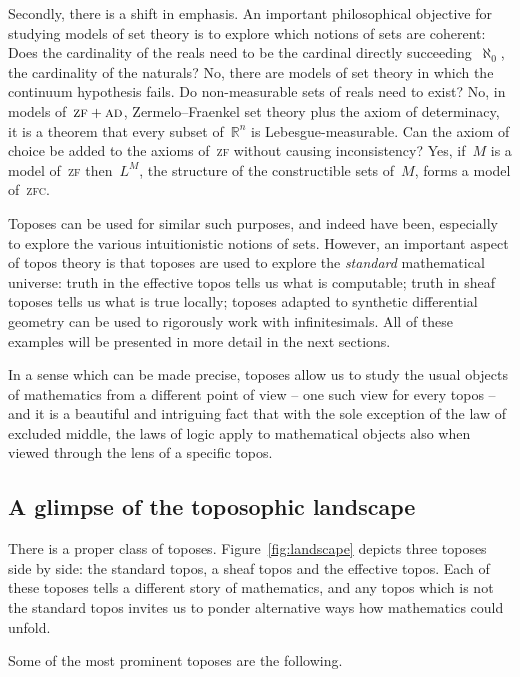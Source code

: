 \documentclass[oneside,reqno]{amsart}
\theoremstyle{definition}
\theoremstyle{plain}
\theoremstyle{remark}
\newcommand{\RR}{\mathbb{R}}
\renewcommand{\_}{\mathpunct{.}\,}
\newcommand{\effective}{ef{}fective\xspace}
\newcommand{\?}{\,{:}\,}
\begin{document}
Secondly, there is a shift in emphasis. An important philosophical objective
for studying models of set theory is to explore which notions of sets are
coherent: Does the cardinality of the reals need to be the cardinal directly
succeeding~$\aleph_0$, the cardinality of the naturals? No, there are models of
set theory in which the continuum hypothesis fails. Do non-measurable sets of
reals need to exist? No, in models of~$\textsc{zf}+\textsc{ad}$,
Zermelo--Fraenkel set theory plus the axiom of determinacy, it is a theorem that
every subset of~$\RR^n$ is Lebesgue-measurable. Can the axiom of choice be
added to the axioms of~\textsc{zf} without causing inconsistency? Yes, if~$M$
is a model of~\textsc{zf} then~$L^M$, the structure of the constructible sets of~$M$, forms a
model of~\textsc{zfc}.

Toposes can be used for similar such purposes, and indeed have been,
especially to explore the various intuitionistic notions of sets. However, an important
aspect of topos theory is that toposes are used to explore the \emph{standard}
mathematical universe: truth in the \effective topos tells us what is
computable; truth in sheaf toposes tells us what is true locally; toposes
adapted to synthetic differential geometry can be used to rigorously work with
infinitesimals. All of these examples will be presented in more detail in the
next sections.

In a sense which can be made precise, toposes allow us to study the usual
objects of mathematics from a different point of view -- one such view for
every topos -- and it is a beautiful and intriguing fact that with the sole
exception of the law of excluded middle, the laws of logic apply to
mathematical objects also when viewed through the lens of a specific topos.


\subsection{A glimpse of the toposophic landscape}
There is a proper class of toposes. Figure~\ref{fig:landscape} depicts three
toposes side by side: the standard topos, a sheaf topos and the \effective
topos. Each of these toposes tells a different story of mathematics, and any
topos which is not the standard topos invites us to ponder alternative ways how
mathematics could unfold.

Some of the most prominent toposes are the following.
\end{document}
